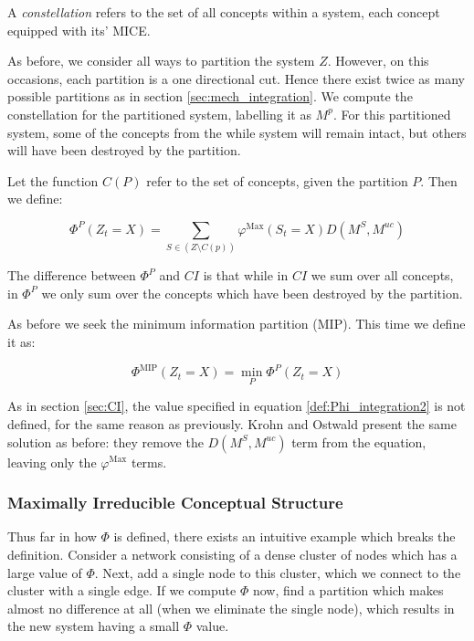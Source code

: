\begin{definition}
	{A \textit{constellation} refers to the set of all concepts within a system, each concept equipped with its' MICE.}
\end{definition}

As before, we consider all ways to partition the system $Z$. However, on this occasions, each partition is a one directional cut. Hence there exist twice as many possible partitions as in section \ref{sec:mech_integration}. We compute the constellation for the partitioned system, labelling it as $M^p$. For this partitioned system, some of the concepts from the while system will remain intact, but others will have been destroyed by the partition.

Let the function $C(P)$ refer to the set of concepts, given the partition $P$. Then we define:

\begin{equation}
\label{def:Phi_integration1}
\Phi^P(Z_t = X) = \sum \limits_{S \in (Z \setminus C(p))} \varphi^{\text{Max}}(S_t = X)D(M^S, M^{uc})
\end{equation}

The difference between $\Phi^P$ and $CI$ is that while in $CI$ we sum over all concepts, in $\Phi^P$ we only sum over the concepts which have been destroyed by the partition.

As before we seek the minimum information partition (MIP). This time we define it as:

\begin{equation}
\label{def:Phi_integration2}
\Phi^{\text{MIP}} (Z_t = X) = \min \limits_{P} \Phi^P(Z_t = X)
\end{equation}

\begin{remark}
	As in section \ref{sec:CI}, the value specified in equation \ref{def:Phi_integration2} is not defined, for the same reason as previously. Krohn and Ostwald present the same solution as before: they remove the $D(M^S, M^{uc})$ term from the equation, leaving only the $\varphi^{\text{Max}}$ terms.
\end{remark}

\subsubsection{Maximally Irreducible Conceptual Structure}

Thus far in how $\Phi$ is defined, there exists an intuitive example which breaks the definition. Consider a network consisting of a dense cluster of nodes which has a large value of $\Phi$. Next, add a single node to this cluster, which we connect to the cluster with a single edge. If we compute $\Phi$ now, find a partition which makes almost no difference at all (when we eliminate the single node), which results in the new system having a small $\Phi$ value. 

